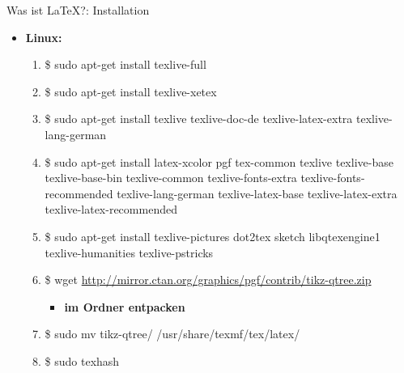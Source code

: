 \begin{frame}{Was ist \LaTeX?: Installation}
\begin{itemize}
\item \textbf{Linux:}
\begin{enumerate}
\item \$ sudo apt-get install texlive-full
\item \$ sudo apt-get install texlive-xetex
\item \$ sudo apt-get install texlive texlive-doc-de texlive-latex-extra texlive-lang-german
\item \$ sudo apt-get install latex-xcolor pgf tex-common texlive texlive-base texlive-base-bin texlive-common texlive-fonts-extra texlive-fonts-recommended texlive-lang-german texlive-latex-base texlive-latex-extra texlive-latex-recommended
\item \$ sudo apt-get install texlive-pictures dot2tex sketch libqtexengine1 texlive-humanities texlive-pstricks
\item \$ wget \url{http://mirror.ctan.org/graphics/pgf/contrib/tikz-qtree.zip}
\begin{itemize}
\item \textbf{im Ordner entpacken}
\end{itemize}

\item \$ sudo mv tikz-qtree/ /usr/share/texmf/tex/latex/
\item \$ sudo texhash
\end{enumerate}
\end{itemize}
\end{frame}
